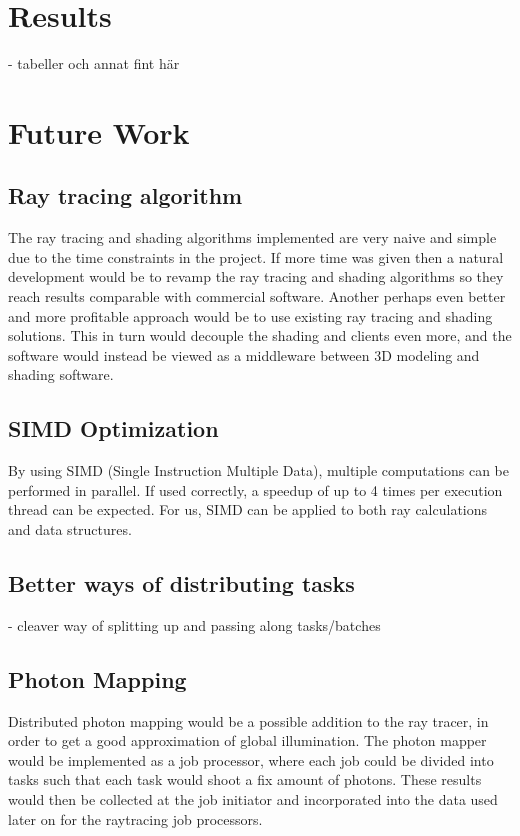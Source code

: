 \chapter{Results}

- tabeller och annat fint här

\chapter{Future Work}
\section{Ray tracing algorithm}
The ray tracing and shading algorithms implemented are very naive and simple due to the time constraints in the project. If more time was given then a natural development would be to revamp the ray tracing and shading algorithms so they reach results comparable with commercial software. Another perhaps even better and more profitable approach would be to use existing ray tracing and shading solutions. This in turn would decouple the shading and clients even more, and the software would instead be viewed as a middleware between 3D modeling and shading software.

\section{SIMD Optimization}
By using SIMD (Single Instruction Multiple Data), multiple computations can be performed in parallel. If used correctly, a speedup of up to 4 times per execution thread can be expected. For us, SIMD can be applied to both ray calculations and data structures.

\section{Better ways of distributing tasks}
- cleaver way of splitting up and passing along tasks/batches\\

\section{Photon Mapping}
Distributed photon mapping would be a possible addition to the ray tracer, in order to get a good approximation of global illumination. The photon mapper would be implemented as a job processor, where each job could be divided into tasks such that each task would shoot a fix amount of photons. These results would then be collected at the job initiator and incorporated into the data used later on for the raytracing job processors.

